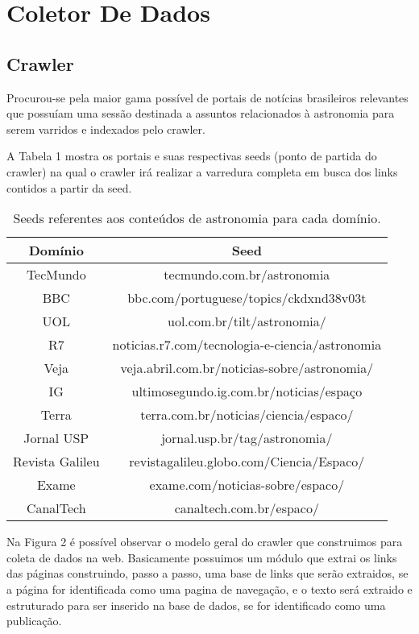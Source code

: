 
\section{Coletor De Dados}

\subsection{Crawler}
Procurou-se pela maior gama possível de portais de notícias brasileiros relevantes que possuíam uma sessão destinada a assuntos relacionados à astronomia para serem varridos e indexados pelo crawler.

A Tabela 1 mostra os portais e suas respectivas seeds (ponto de partida do crawler) na qual o crawler irá realizar a varredura completa em busca dos links contidos a partir da seed.


\begin{table}[H]
\begin{tabular}{|c|c|}
\hline
Domínio & Seed\\\hline
TecMundo & tecmundo.com.br/astronomia \\\hline
BBC & bbc.com/portuguese/topics/ckdxnd38v03t\\\hline
UOL & uol.com.br/tilt/astronomia/\\\hline
R7 & noticias.r7.com/tecnologia-e-ciencia/astronomia \\\hline
Veja & veja.abril.com.br/noticias-sobre/astronomia/ \\\hline
IG & ultimosegundo.ig.com.br/noticias/espaço \\\hline
Terra & terra.com.br/noticias/ciencia/espaco/\\\hline
Jornal USP & jornal.usp.br/tag/astronomia/\\\hline
Revista Galileu & revistagalileu.globo.com/Ciencia/Espaco/\\\hline
Exame & exame.com/noticias-sobre/espaco/\\\hline
CanalTech & canaltech.com.br/espaco/\\\hline
\end{tabular}
\caption{Seeds referentes aos conteúdos de astronomia para cada domínio.}
\end{table}

Na Figura 2 é possível observar o modelo geral do crawler que construimos para coleta de dados na web. Basicamente possuimos um módulo que extrai os links das páginas construindo, passo a passo, uma base de links que serão extraidos, se  a página for identificada como uma pagina de navegação, e o texto será extraido e estruturado para ser inserido na base de dados, se for identificado como uma publicação.


